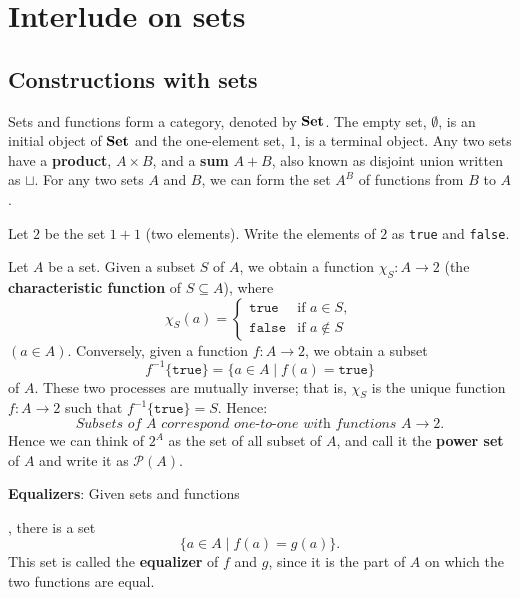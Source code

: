 \section{Interlude on sets}
\subsection{Constructions with sets}
Sets and functions form a category, denoted by $\mathbf{Set}$. The empty set, $\emptyset$, is an initial object of $\mathbf{Set}$ and the one-element set, $1$, is a terminal object. Any two sets have a \textbf{product}, $A\times B$, and a \textbf{sum} $A+B$, also known as disjoint union written as $\sqcup$. For any two sets $A$ and $B$, we can form the set $A^B$ of functions from $B$ to $A$.\par

Let $2$ be the set $1+1$ (two elements). Write the elements of $2$ as \texttt{true} and \texttt{false}.\par

Let $A$ be a set. Given a subset $S$ of $A$, we obtain a function $\chi_S:A\to 2$ (the \textbf{characteristic function} of $S\subseteq A$), where
\begin{equation*}
    \chi_S(a) = \begin{cases}
        \texttt{true} & \text{if } a\in S,\\
        \texttt{false} & \text{if } a\notin S
    \end{cases}
\end{equation*}
$(a\in A)$. Conversely, given a function $f:A\to 2$, we obtain a subset
\begin{equation*}
    f^{-1}\{\texttt{true}\} = \{a\in A\mid f(a)=\texttt{true}\}
\end{equation*}
of $A$. These two processes are mutually inverse; that is, $\chi_S$ is the unique function $f:A\to 2$ such that $f^{-1}\{\texttt{true}\}=S$. Hence:
\begin{equation*}
    \textit{Subsets of $A$ correspond one-to-one with functions } A\to 2.
\end{equation*}
Hence we can think of $2^A$ as the set of all subset of $A$, and call it the \textbf{power set} of $A$ and write it as $\mathcal{P}(A)$.\par

\bigskip\noindent\textbf{Equalizers}: Given sets and functions , there is a set
\begin{equation*}
    \{ a\in A\mid f(a)=g(a) \}.
\end{equation*}
This set is called the \textbf{equalizer} of $f$ and $g$, since it is the part of $A$ on which the two functions are equal.\par

